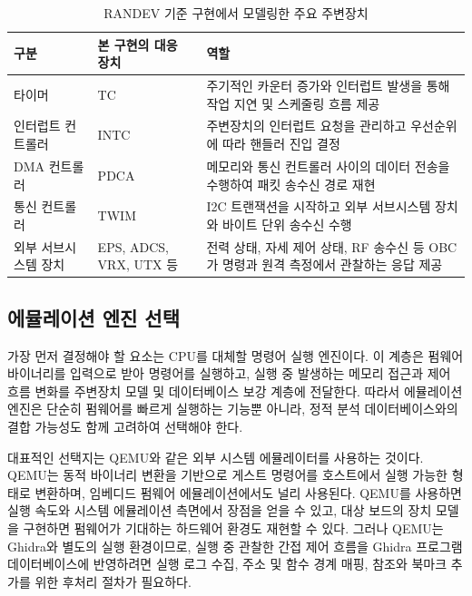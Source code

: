 \documentclass[master,korean,final]{kaist-ucs}
\begin{document}
\begin{table}[h]
\caption{RANDEV 기준 구현에서 모델링한 주요 주변장치}
\label{tab:randev-device-model}
\begin{center}
\begin{small}
\begin{tabular}{p{2.4cm}p{3.6cm}p{6.4cm}}
\hline\hline
구분 & 본 구현의 대응 장치 & 역할 \\
\hline
타이머 & TC & 주기적인 카운터 증가와 인터럽트 발생을 통해 작업 지연 및 스케줄링 흐름 제공 \\
인터럽트 컨트롤러 & INTC & 주변장치의 인터럽트 요청을 관리하고 우선순위에 따라 핸들러 진입 결정 \\
DMA 컨트롤러 & PDCA & 메모리와 통신 컨트롤러 사이의 데이터 전송을 수행하여 패킷 송수신 경로 재현 \\
통신 컨트롤러 & TWIM & I2C 트랜잭션을 시작하고 외부 서브시스템 장치와 바이트 단위 송수신 수행 \\
외부 서브시스템 장치 & EPS, ADCS, VRX, UTX 등 & 전력 상태, 자세 제어 상태, RF 송수신 등 OBC가 명령과 원격 측정에서 관찰하는 응답 제공 \\
\hline\hline
\end{tabular}
\end{small}
\end{center}
\end{table}

\subsection{에뮬레이션 엔진 선택}

가장 먼저 결정해야 할 요소는 CPU를 대체할 명령어 실행 엔진이다. 이 계층은 펌웨어 바이너리를 입력으로 받아 명령어를 실행하고, 실행 중 발생하는 메모리 접근과 제어 흐름 변화를 주변장치 모델 및 데이터베이스 보강 계층에 전달한다. 따라서 에뮬레이션 엔진은 단순히 펌웨어를 빠르게 실행하는 기능뿐 아니라, 정적 분석 데이터베이스와의 결합 가능성도 함께 고려하여 선택해야 한다.

대표적인 선택지는 QEMU와 같은 외부 시스템 에뮬레이터를 사용하는 것이다. QEMU는 동적 바이너리 변환을 기반으로 게스트 명령어를 호스트에서 실행 가능한 형태로 변환하며, 임베디드 펌웨어 에뮬레이션에서도 널리 사용된다\cite{QEMU}. QEMU를 사용하면 실행 속도와 시스템 에뮬레이션 측면에서 장점을 얻을 수 있고, 대상 보드의 장치 모델을 구현하면 펌웨어가 기대하는 하드웨어 환경도 재현할 수 있다. 그러나 QEMU는 Ghidra와 별도의 실행 환경이므로, 실행 중 관찰한 간접 제어 흐름을 Ghidra 프로그램 데이터베이스에 반영하려면 실행 로그 수집, 주소 및 함수 경계 매핑, 참조와 북마크 추가를 위한 후처리 절차가 필요하다.
\end{document}
